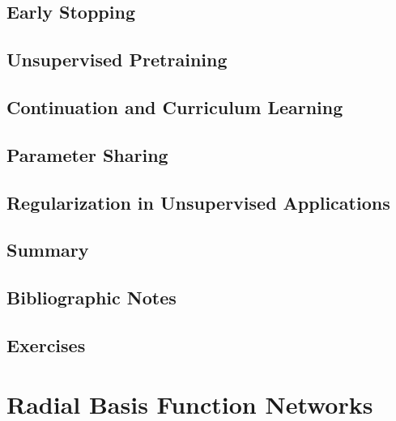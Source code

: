 \documentclass[a4paper]{article}
\begin{document}
\subsection{Early Stopping}

\subsection{Unsupervised Pretraining}

\subsection{Continuation and Curriculum Learning}

\subsection{Parameter Sharing}

\subsection{Regularization in Unsupervised Applications}

\subsection{Summary}

\subsection{Bibliographic Notes}

\subsection{Exercises}

\newpage
\section{Radial Basis Function Networks}
\end{document}

